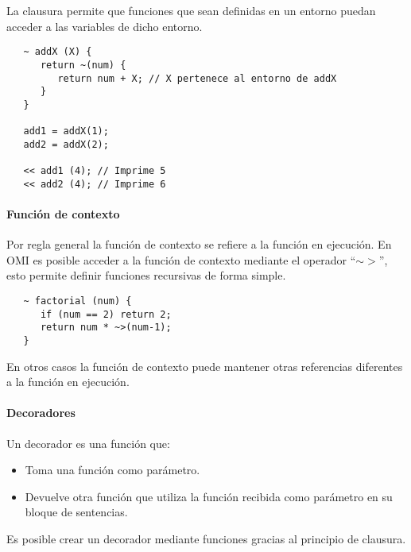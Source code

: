 La clausura permite que funciones que sean definidas en un entorno puedan acceder a las variables de dicho entorno. \\

\begin{lstlisting}
   ~ addX (X) { 
      return ~(num) {
         return num + X; // X pertenece al entorno de addX
      }
   }
   
   add1 = addX(1);
   add2 = addX(2);
   
   << add1 (4); // Imprime 5
   << add2 (4); // Imprime 6
\end{lstlisting}

\paragraph{Función de contexto}
Por regla general la función de contexto se refiere a la función en ejecución. En OMI es 
posible acceder a la función de contexto mediante el operador ``$\sim>$'', esto permite definir 
funciones recursivas de forma simple. \\

\begin{lstlisting}
   ~ factorial (num) {
      if (num == 2) return 2;
      return num * ~>(num-1);
   }
\end{lstlisting}

En otros casos la función de contexto puede mantener otras referencias diferentes a la función 
en ejecución.

\paragraph{Decoradores}


Un decorador es una función que:
\begin{itemize}
\item Toma una función como parámetro. 
\item Devuelve otra función que utiliza la función recibida como parámetro en su bloque de sentencias.
\end{itemize}

Es posible crear un decorador mediante funciones gracias al principio de clausura. \\

